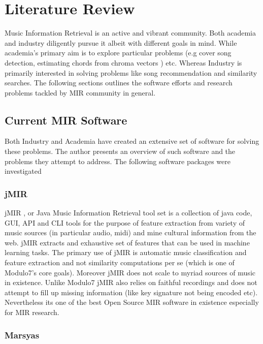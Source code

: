 \chapter{Literature Review}

\noindent Music Information Retrieval is an active and vibrant community. Both academia and industry diligently pursue it albeit with different goals in mind. While academia's primary aim is to explore particular problems (e.g cover song detection, estimating chords from chroma vectors \cite{chord-detection} ) etc. Whereas Industry is primarily interested in solving problems like song recommendation and similarity searches. The following sections outlines the software efforts and research problems tackled by MIR community in general. 

\section{Current MIR Software}
\noindent Both Industry and Academia have created an extensive set of software for solving these problems. The author presents an overview of such software and the problems they attempt to address. The following software packages were investigated 

\subsection{jMIR}

\noindent jMIR  \cite{jMIR}, or Java Music Information Retrieval tool set is a collection of java code, GUI, API and CLI tools for the purpose of feature extraction from variety of music sources (in particular audio, midi) and mine cultural information from the web. jMIR extracts and exhaustive set of features that can be used in machine learning tasks. The primary use of jMIR is automatic music classification and feature extraction and not similarity computations per se (which is one of Modulo7's core goals). Moreover jMIR does not scale to myriad sources of music in existence. Unlike Modulo7 jMIR also relies on faithful recordings and does not attempt to fill up missing information (like key signature not being encoded etc). Nevertheless its one of the best Open Source MIR software in existence especially for MIR research. 

\subsection{Marsyas}

